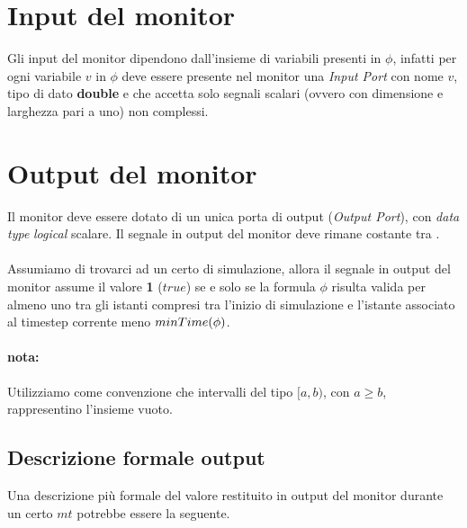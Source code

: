 \documentclass[10pt,a4paper]{article}
\newcommand{\DataType}{\emph{data type}}
\newcommand{\Iport}{\emph{Input Port}}
\newcommand{\Oport}{\emph{Output Port}}
\begin{document}
	\section{Input del monitor}
	Gli input del monitor dipendono dall'insieme di variabili presenti in $\phi$, infatti  per ogni variabile $v$ in $\phi$ deve essere presente nel monitor una \Iport{} con nome $v$, tipo di dato \textbf{double} e che accetta solo segnali scalari (ovvero con dimensione e larghezza pari a uno) non complessi. 
	
	
	\section{Output del monitor}
	Il monitor deve essere dotato di un unica porta di output (\Oport), con \DataType{} \emph{logical} scalare.
	Il segnale in output del monitor deve rimane costante tra \Mstep{}.
	\paragraph{}Assumiamo di trovarci ad un certo \Mstep{} di simulazione, allora il segnale in output del monitor assume il valore \textbf{1} ($true$) se e solo se la formula $\phi$ risulta valida per almeno uno tra gli istanti compresi tra l'inizio di simulazione e l'istante associato al timestep corrente meno $minTime(\phi)$.	

	\hrulefill
	\paragraph{nota:}
	Utilizziamo come convenzione che intervalli del tipo $[a,b)$, con $a\ge b$, rappresentino l'insieme vuoto.
	
	\hrulefill
	
	\subsection{Descrizione formale output}
	Una descrizione più formale del valore restituito in output del monitor durante un certo \Mstep{} $mt$ potrebbe essere la seguente.
\end{document}
